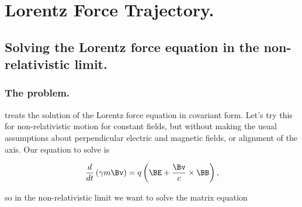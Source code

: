 
%

\chapter{Lorentz Force Trajectory.}
\label{chap:lorentzRotation}
\date{May 7, 2008.}
{}

\beginArtWithToc

\section{Solving the Lorentz force equation in the non-relativistic limit.}

\subsection{The problem.}

\cite{doran2003gap} treats the solution of the Lorentz force equation in covariant form.  Let's try this for non-relativistic motion for constant fields, but without making the usual assumptions about perpendicular electric and magnetic fields, or alignment of the axis.  Our equation to solve is

%
%

\begin{equation}\label{eqn:lorentzRotation:10}
\frac{d}{dt} \left( \gamma m \Bv \right) = q \left( \BE + \frac{\Bv}{c} \times \BB \right),
\end{equation}

so in the non-relativistic limit we want to solve the matrix equation

